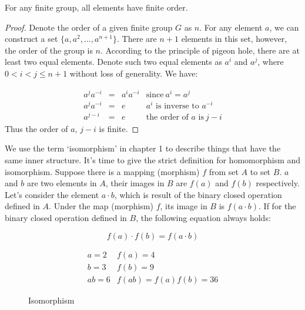\documentclass[b5paper]{article}
\begin{document}
\begin{theorem}
For any finite group, all elements have finite order.
\end{theorem}

\begin{proof}
Denote the order of a given finite group $G$ as $n$. For any element $a$, we can construct a set $\{a, a^2, ..., a^{n+1}\}$. There are $n + 1$ elements in this set, however, the order of the group is $n$. According to the principle of pigeon hole, there are at least two equal elements. Denote such two equal elements as $a^i$ and $a^j$, where $0 < i < j \leq n + 1$ without loss of generality. We have:

\[
\begin{array}{rcll}
a^ja^{-i} & = & a^{i}a^{-i} & \text{since}\ a^i = a^j \\
a^ja^{-i} & = & e & \text{$a^i$ is inverse to $a^{-i}$} \\
a^{j-i} & = & e & \text{the order of $a$ is}\ j - i
\end{array}
\]
Thus the order of $a$, $j - i$ is finite.
\end{proof}

We use the term `isomorphism' in chapter 1 to describe things that have the same inner structure. It's time to give the strict definition for homomorphism and isomorphism. Suppose there is a mapping (morphism) $f$ from set $A$ to set $B$. $a$ and $b$ are two elements in $A$, their images in $B$ are $f(a)$ and $f(b)$ respectively. Let's consider the element $a \cdot b$, which is result of the binary closed operation defined in $A$. Under the map (morphism) $f$, its image in $B$ is $f(a \cdot b)$. If for the binary closed operation defined in $B$, the following equation always holds:

\[
f(a) \cdot f(b) = f(a \cdot b)
\]

\begin{figure}[htbp]
\centering
{}
\[
\begin{array}{rl}
a = 2 & f(a) = 4 \\
b = 3 & f(b) = 9 \\
ab = 6 & f(ab) = f(a)f(b) = 36
\end{array}
\]
\caption{Isomorphism}
\label{fig:isomorphism}
\end{figure}
\end{document}

